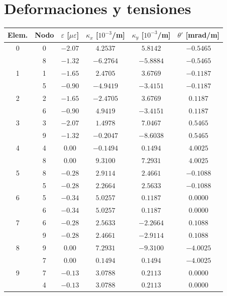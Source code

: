 \documentclass[11pt,a4paper]{article}
\begin{document}
\section{Deformaciones y tensiones}

\begin{center}
\begin{minipage}{\linewidth}
\centering
{}\label{tab:viga3d-deformaciones}
\begin{tabular}{@{}cccccc@{}}
\toprule
Elem. & Nodo & $\varepsilon$ [$\mu\varepsilon$] & $\kappa_x$ [$10^{-3}$/m] & $\kappa_y$ [$10^{-3}$/m] & $\theta'$ [mrad/m] \\
\midrule
0 & 0 & $-2.07$ & $4.2537$ & $5.8142$ & $-0.5465$ \\
 & 8 & $-1.32$ & $-6.2764$ & $-5.8884$ & $-0.5465$ \\
1 & 1 & $-1.65$ & $2.4705$ & $3.6769$ & $-0.1187$ \\
 & 5 & $-0.90$ & $-4.9419$ & $-3.4151$ & $-0.1187$ \\
2 & 2 & $-1.65$ & $-2.4705$ & $3.6769$ & $0.1187$ \\
 & 6 & $-0.90$ & $4.9419$ & $-3.4151$ & $0.1187$ \\
3 & 3 & $-2.07$ & $1.4978$ & $7.0467$ & $0.5465$ \\
 & 9 & $-1.32$ & $-0.2047$ & $-8.6038$ & $0.5465$ \\
4 & 4 & $0.00$ & $-0.1494$ & $0.1494$ & $4.0025$ \\
 & 8 & $0.00$ & $9.3100$ & $7.2931$ & $4.0025$ \\
5 & 8 & $-0.28$ & $2.9114$ & $2.4661$ & $-0.1088$ \\
 & 5 & $-0.28$ & $2.2664$ & $2.5633$ & $-0.1088$ \\
6 & 5 & $-0.34$ & $5.0257$ & $0.1187$ & $0.0000$ \\
 & 6 & $-0.34$ & $5.0257$ & $0.1187$ & $0.0000$ \\
7 & 6 & $-0.28$ & $2.5633$ & $-2.2664$ & $0.1088$ \\
 & 9 & $-0.28$ & $2.4661$ & $-2.9114$ & $0.1088$ \\
8 & 9 & $0.00$ & $7.2931$ & $-9.3100$ & $-4.0025$ \\
 & 7 & $0.00$ & $0.1494$ & $0.1494$ & $-4.0025$ \\
9 & 7 & $-0.13$ & $3.0788$ & $0.2113$ & $0.0000$ \\
 & 4 & $-0.13$ & $3.0788$ & $0.2113$ & $0.0000$ \\
\bottomrule
\end{tabular}
\end{minipage}
\end{center}
\end{document}
